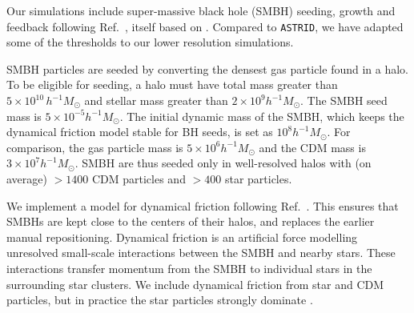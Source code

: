 \documentclass[a4paper,11pt]{article}
\newcommand{\astrid}{\texttt{ASTRID}}
\begin{document}
Our simulations include super-massive black hole (SMBH) seeding, growth and feedback following Ref.~\cite{Ni:2022}, itself based on \cite{Feng:2016,SDH2005,DSH2005}. Compared to \astrid, we have adapted some of the thresholds to our lower resolution simulations.

SMBH particles are seeded by converting the densest gas particle found in a halo. To be eligible for seeding, a halo must have total mass greater than $5\times 10^{10}\,h^{-1}M_\odot$ and stellar mass greater than $2 \times 10^9 h^{-1} M_\odot$. The SMBH seed mass is $5 \times 10^{-5} h^{-1} M_\odot$. The initial dynamic mass of the SMBH, which keeps the dynamical friction model stable for BH seeds, is set as $10^{8} h^{-1} M_\odot$. For comparison, the gas particle mass is $5 \times 10^6 h^{-1} M_\odot$ and the CDM mass is $ 3 \times 10^7 h^{-1} M_\odot$. SMBH are thus seeded only in well-resolved halos with (on average) $> 1400$ CDM particles and $>400$ star particles.

We implement a model for dynamical friction following Ref.~\citep{Chen:2021}. This ensures that SMBHs are kept close to the centers of their halos, and replaces the earlier manual repositioning. Dynamical friction is an artificial force modelling unresolved small-scale interactions between the SMBH and nearby stars. These interactions transfer momentum from the SMBH to individual stars in the surrounding star clusters. We include dynamical friction from star and CDM particles, but in practice the star particles strongly dominate \cite{Chen:2021}.
\end{document}
